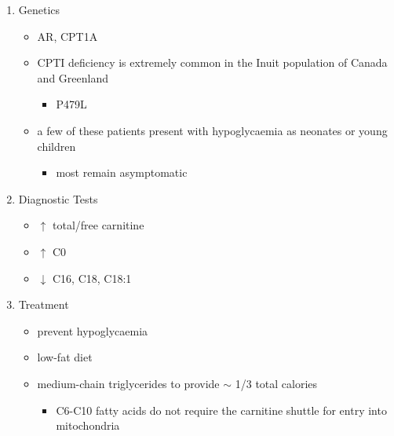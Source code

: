 \documentclass{scrartcl}
\begin{document}
\begin{enumerate}
\item Genetics
\label{sec:org3a05883}
\begin{itemize}
\item AR, CPT1A
\item CPTI deficiency is extremely common in the Inuit population of Canada and Greenland
\begin{itemize}
\item P479L
\end{itemize}
\item a few of these patients present with hypoglycaemia as neonates or young children
\begin{itemize}
\item most remain asymptomatic
\end{itemize}
\end{itemize}
\item Diagnostic Tests
\label{sec:org787d9e5}
\begin{itemize}
\item \(\uparrow\) total/free carnitine
\item \(\uparrow\) C0
\item \(\downarrow\) C16, C18, C18:1
\end{itemize}
\item Treatment
\label{sec:orgbd5304e}
\begin{itemize}
\item prevent hypoglycaemia
\item low-fat diet
\item medium-chain triglycerides to provide \(\sim\) 1/3 total calories
\begin{itemize}
\item C6-C10 fatty acids do not require the carnitine shuttle for entry
into mitochondria
\end{itemize}
\end{itemize}
\end{enumerate}
\end{document}
